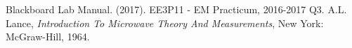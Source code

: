 \begin{thebibliography}{99}

 Blackboard Lab Manual. (2017). EE3P11 - EM Practicum, 2016-2017 Q3.
 A.L. Lance, \textit{Introduction To Microwave Theory And Measurements}, New York: McGraw-Hill, 1964.\\

\end{thebibliography}


